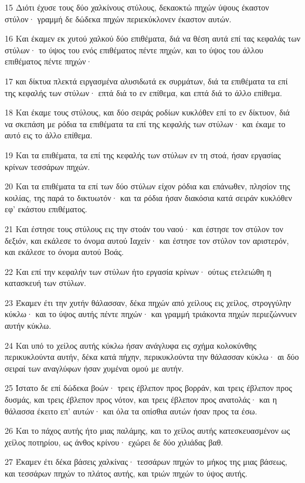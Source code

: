 \par 15 Διότι έχυσε τους δύο χαλκίνους στύλους, δεκαοκτώ πηχών ύψους έκαστον στύλον· γραμμή δε δώδεκα πηχών περιεκύκλονεν έκαστον αυτών.
\par 16 Και έκαμεν εκ χυτού χαλκού δύο επιθέματα, διά να θέση αυτά επί τας κεφαλάς των στύλων· το ύψος του ενός επιθέματος πέντε πηχών, και το ύψος του άλλου επιθέματος πέντε πηχών·
\par 17 και δίκτυα πλεκτά ειργασμένα αλυσιδωτά εκ συρμάτων, διά τα επιθέματα τα επί της κεφαλής των στύλων· επτά διά το εν επίθεμα, και επτά διά το άλλο επίθεμα.
\par 18 Και έκαμε τους στύλους, και δύο σειράς ροδίων κυκλόθεν επί το εν δίκτυον, διά να σκεπάση με ρόδια τα επιθέματα τα επί της κεφαλής των στύλων· και έκαμε το αυτό εις το άλλο επίθεμα.
\par 19 Και τα επιθέματα, τα επί της κεφαλής των στύλων εν τη στοά, ήσαν εργασίας κρίνων τεσσάρων πηχών.
\par 20 Και τα επιθέματα τα επί των δύο στύλων είχον ρόδια και επάνωθεν, πλησίον της κοιλίας, της παρά το δικτυωτόν· και τα ρόδια ήσαν διακόσια κατά σειράν κυκλόθεν εφ' εκάστου επιθέματος.
\par 21 Και έστησε τους στύλους εις την στοάν του ναού· και έστησε τον στύλον τον δεξιόν, και εκάλεσε το όνομα αυτού Ιαχείν· και έστησε τον στύλον τον αριστερόν, και εκάλεσε το όνομα αυτού Βοάς.
\par 22 Και επί την κεφαλήν των στύλων ήτο εργασία κρίνων· ούτως ετελειώθη η κατασκευή των στύλων.
\par 23 Έκαμεν έτι την χυτήν θάλασσαν, δέκα πηχών από χείλους εις χείλος, στρογγύλην κύκλω· και το ύψος αυτής πέντε πηχών· και γραμμή τριάκοντα πηχών περιεζώννυεν αυτήν κύκλω.
\par 24 Και υπό το χείλος αυτής κύκλω ήσαν ανάγλυφα εις σχήμα κολοκύνθης περικυκλούντα αυτήν, δέκα κατά πήχην, περικυκλούντα την θάλασσαν κύκλω· αι δύο σειραί των αναγλύφων ήσαν χυμέναι ομού με αυτήν.
\par 25 Ίστατο δε επί δώδεκα βοών· τρεις έβλεπον προς βορράν, και τρεις έβλεπον προς δυσμάς, και τρεις έβλεπον προς νότον, και τρεις έβλεπον προς ανατολάς· και η θάλασσα έκειτο επ' αυτών· και όλα τα οπίσθια αυτών ήσαν προς τα έσω.
\par 26 Και το πάχος αυτής ήτο μιας παλάμης, και το χείλος αυτής κατεσκευασμένον ως χείλος ποτηρίου, ως άνθος κρίνου· εχώρει δε δύο χιλιάδας βαθ.
\par 27 Έκαμεν έτι δέκα βάσεις χαλκίνας· τεσσάρων πηχών το μήκος της μιας βάσεως, και τεσσάρων πηχών το πλάτος αυτής, και τριών πηχών το ύψος αυτής.

